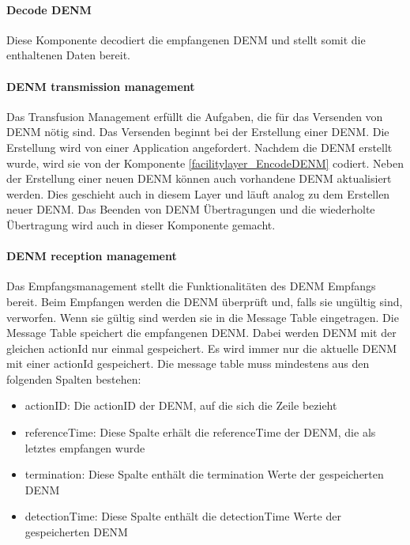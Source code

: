 \paragraph{Decode DENM}
Diese Komponente decodiert die empfangenen \ac{DENM} und stellt somit die enthaltenen Daten bereit.

\paragraph{DENM transmission management}
Das Transfusion Management erfüllt die Aufgaben, die für das Versenden von \ac{DENM} nötig sind. Das Versenden beginnt bei der Erstellung einer \ac{DENM}. Die Erstellung wird von einer Application angefordert. Nachdem die \ac{DENM} erstellt wurde, wird sie von der Komponente \ref{facilitylayer_EncodeDENM} codiert. Neben der Erstellung einer neuen \ac{DENM} können auch vorhandene \ac{DENM} aktualisiert werden. Dies geschieht auch in diesem Layer und läuft analog zu dem Erstellen neuer \ac{DENM}. Das Beenden von \ac{DENM} Übertragungen und die wiederholte Übertragung wird auch in dieser Komponente gemacht.

\paragraph{DENM reception management}
Das Empfangsmanagement stellt die Funktionalitäten des \ac{DENM} Empfangs bereit. Beim Empfangen werden die \ac{DENM} überprüft und, falls sie ungültig sind, verworfen. Wenn sie gültig sind werden sie in die Message Table eingetragen. Die Message Table speichert die empfangenen \ac{DENM}. Dabei werden \ac{DENM} mit der gleichen actionId nur einmal gespeichert. Es wird immer nur die aktuelle \ac{DENM} mit einer actionId gespeichert. Die message table muss mindestens aus den folgenden Spalten bestehen:

\begin{itemize}
	\item actionID: Die actionID der \ac{DENM}, auf die sich die Zeile bezieht
	\item referenceTime: Diese Spalte erhält die referenceTime der \ac{DENM}, die als letztes empfangen wurde
	\item termination: Diese Spalte enthält die termination Werte der gespeicherten \ac{DENM}
	\item detectionTime: Diese Spalte enthält die detectionTime Werte der gespeicherten \ac{DENM}
\end{itemize}

